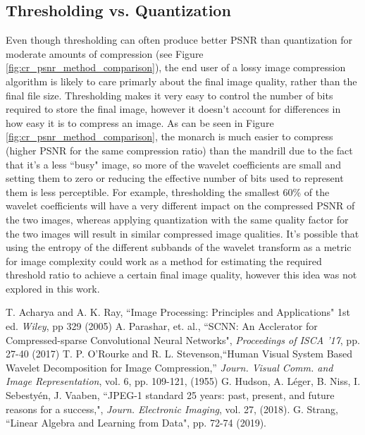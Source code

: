 \documentclass[conference]{IEEEtran}
\begin{document}
\subsection{Thresholding vs. Quantization}
Even though thresholding can often produce better PSNR than quantization for moderate amounts of compression (see Figure \ref{fig:cr_psnr_method_comparison}), the end user of a lossy image compression algorithm is likely to care primarly about the final image quality, rather than the final file size.
Thresholding makes it very easy to control the number of bits required to store the final image, however it doesn't account for differences in how easy it is to compress an image.
As can be seen in Figure \ref{fig:cr_psnr_method_comparison}, the monarch is much easier to compress (higher PSNR for the same compression ratio) than the mandrill due to the fact that it's a less ``busy" image, so more of the wavelet coefficients are small and setting them to zero or reducing the effective number of bits used to represent them is less perceptible.
For example, thresholding the smallest 60\% of the wavelet coefficients will have a very different impact on the compressed PSNR of the two images,
whereas applying quantization with the same quality factor for the two images will result in similar compressed image qualities.
It's possible that using the entropy of the different subbands of the wavelet transform as a metric for image complexity could work as a method for estimating the required threshold ratio to achieve a certain final image quality, however this idea was not explored in this work.

\begin{thebibliography}{00}
     T. Acharya and A. K. Ray, ``Image Processing: Principles and Applications" 1st ed. \textit{Wiley}, pp 329 (2005)
     A. Parashar, et. al., ``SCNN: An Acclerator for Compressed-sparse Convolutional Neural Networks", \textit{Proceedings of ISCA '17}, pp. 27-40 (2017)
     T. P. O'Rourke and R. L. Stevenson,``Human Visual System Based Wavelet Decomposition for Image Compression,'' \textit{Journ. Visual Comm. and Image Representation}, vol. 6, pp. 109-121, (1955)
     G. Hudson, A. L{\'e}ger, B. Niss, I. Sebesty{\'e}n, J. Vaaben, ``JPEG-1 standard 25 years: past, present, and future reasons for a success,", \textit{Journ. Electronic Imaging}, vol. 27, (2018).
     G. Strang, ``Linear Algebra and Learning from Data", pp. 72-74 (2019).
\end{thebibliography}
\end{document}
